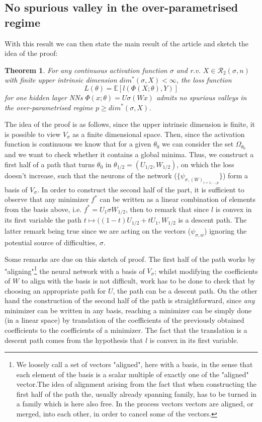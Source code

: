 \documentclass[11pt]{article} %
\newtheorem{theorem}{Theorem}[section]
\begin{document}
\subsection{No spurious valley in the over-parametrised regime}
With this result we can then state the main result of the article and sketch the idea of the proof:
\begin{theorem}\label{th:mainTh}
	For any continuous activation function $\sigma$ and r.v. $X\in \mathcal{R}_2(\sigma, n)$ with finite upper intrinsic dimension $dim^*(\sigma, X)<\infty$, the loss function
\begin{equation}
	L(\theta) = \mathbb{E}[l(\Phi(X;\theta),Y)]
\end{equation}
for one hidden layer NNs $\Phi(x;\theta) = U\sigma(Wx)$ admits no spurious valleys in the over-parametrised regime $p\geq dim^*(\sigma, X)$.
\end{theorem}
The idea of the proof is as follows, since the upper intrinsic dimension is finite, it is possible to view $V_\sigma$ as a finite dimensional space.
Then, since the activation function is continuous we know that for a given $\theta_0$ we can consider the set $\Omega_{\theta_0}$ and we want to check whether it contains a global minima.
\newline
Thus, we construct a first half of a path that turns $\theta_0$ in $\theta_{1/2} = (U_{1/2}, W_{1/2})$, on which the loss doesn't increase, such that the neurons of the network ($\{\psi_{\sigma, (W)_{i=1,\cdots,p}}\}$) form a basis of $V_\sigma$.
In order to construct the second half of the part, it is sufficient to observe that any minimizer $f^*$ can be written as a linear combination of elements from the basis above, i.e. $f^* = U_1\sigma W_{1/2}$, then to remark that since $l$ is convex in its first variable the path $t\mapsto((1-t)U_{1/2} + t U_1, W_{1/2}$ is a descent path.
The latter remark being true since we are acting on the vectors ($\psi_{\sigma,w}$) ignoring the potential source of difficulties, $\sigma$.
\par
Some remarks are due on this sketch of proof. The first half of the path works by "aligning"\footnote{We loosely call a set of vectors "aligned", here with a basis, in the sense that each element of the basis is a scalar multiple of exactly one of the "aligned" vector.The idea of alignment arising from the fact that when constructing the first half of the path the, usually already spanning family, has to be turned in a family which is here also free. In the process vectors vectors are aligned, or merged, into each other, in order to cancel some of the vectors.} the neural network with a basis of $V_\sigma$; whilst modifying the coefficients of $W$ to align with the basis is not difficult, work has to be done to check that by choosing an appropriate path for $U$, the path can be a descent path. On the other hand the construction of the second half of the path is straightforward, since \emph{any} minimizer can be written in any basis, reaching a minimizer can be simply done (in a linear space) by translation of the coefficients of the previously obtained coefficients to the coefficients of a minimizer. The fact that the translation is a descent path comes from the hypothesis that $l$ is convex in its first variable.
\end{document}
